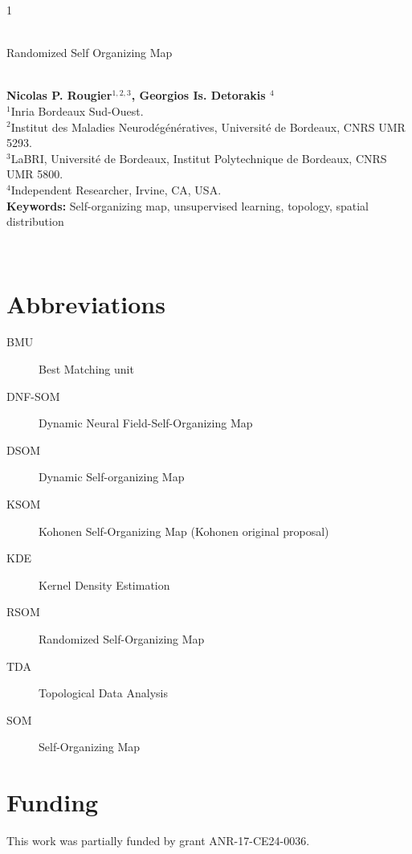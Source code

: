

\linenumbers





\hspace{13.9cm}1

\ \vspace{20mm}\\

{\LARGE Randomized Self Organizing Map}

\ \\
{\bf \large Nicolas P. Rougier$^{\displaystyle 1, \displaystyle 2, \displaystyle 3}$, Georgios Is. Detorakis $^{\displaystyle 4}$}\\
{$^{\displaystyle 1}$Inria Bordeaux Sud-Ouest.}\\
{$^{\displaystyle 2}$Institut des Maladies Neurodégénératives, Université  de Bordeaux, CNRS UMR 5293.}\\
{$^{\displaystyle 3}$LaBRI, Université de Bordeaux, Institut Polytechnique de Bordeaux, CNRS UMR 5800.}\\
{$^{\displaystyle 4}$Independent Researcher, Irvine, CA, USA.}\\
%

{\bf Keywords:} Self-organizing map, unsupervised learning, topology, spatial distribution 

\thispagestyle{empty}
%
\ \vspace{-0mm}\\
%
\begin{center} {\bf } \end{center}







\section*{Abbreviations}
\begin{description}
    \item[BMU]     Best Matching unit
    \item[DNF-SOM] Dynamic Neural Field-Self-Organizing Map
    \item[DSOM]    Dynamic Self-organizing Map
    \item[KSOM]    Kohonen Self-Organizing Map (Kohonen original proposal)
    \item[KDE]     Kernel Density Estimation
    \item[RSOM]    Randomized Self-Organizing Map
    \item[TDA]     Topological Data Analysis
    \item[SOM]     Self-Organizing Map
\end{description}

\section*{Funding}
This work was partially funded by grant ANR-17-CE24-0036.






\newpage
\appendix



